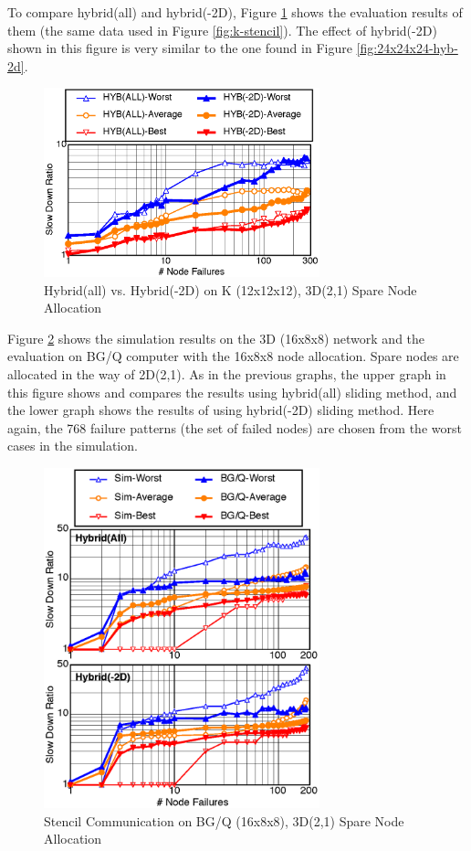 \documentclass[Afour,times,sagev]{sagej}
\begin{document}
To compare hybrid(all) and hybrid(-2D), Figure \ref{fig:k-comparison}
shows the evaluation results of them (the same data used in Figure
\ref{fig:k-stencil}). The effect of hybrid(-2D) shown in this figure
is very similar to the one found in Figure \ref{fig:24x24x24-hyb-2d}.

\begin{figure}[ht]
\centering
\includegraphics[width=80mm]{Figs/K-comparison-CL.eps}
  \caption{Hybrid(all) vs. Hybrid(-2D) on K (12x12x12), 3D(2,1) Spare Node
    Allocation}
  \label{fig:k-comparison}
\end{figure}

Figure \ref{fig:bgq-stencil} shows the simulation results on the
3D (16x8x8) network and the evaluation on BG/Q computer with the 16x8x8
node allocation. Spare nodes are allocated in the way of
2D(2,1). As in the previous graphs, the upper graph in this figure
shows and compares the results using hybrid(all) sliding method, and
the lower graph shows the results of using hybrid(-2D) sliding
method. Here again, the 768 failure patterns (the set of failed nodes)
are chosen from the worst cases in the simulation.

\begin{figure}[ht]
\centering
\includegraphics[width=80mm]{Figs/BGQ-Stencil-CL.eps}
  \caption{Stencil Communication on BG/Q (16x8x8), 3D(2,1) Spare Node
    Allocation}
  \label{fig:bgq-stencil}
\end{figure}
\end{document}
